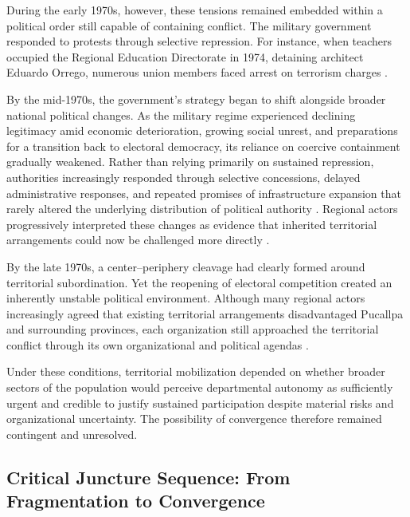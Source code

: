 \documentclass[12pt]{article}
\begin{document}
During the early 1970s, however, these tensions remained embedded within a political order still capable of containing conflict. The military government responded to protests through selective repression. For instance, when teachers occupied the Regional Education Directorate in 1974, detaining architect Eduardo Orrego, numerous union members faced arrest on terrorism charges \parencite{matos_tuesta_apuntes_2005,rengifo_pucallpazos_2020}.

By the mid-1970s, the government's strategy began to shift alongside broader national political changes. As the military regime experienced declining legitimacy amid economic deterioration, growing social unrest, and preparations for a transition back to electoral democracy, its reliance on coercive containment gradually weakened. Rather than relying primarily on sustained repression, authorities increasingly responded through selective concessions, delayed administrative responses, and repeated promises of infrastructure expansion that rarely altered the underlying distribution of political authority \parencite{vivanco_pimentel_gran_1997}. Regional actors progressively interpreted these changes as evidence that inherited territorial arrangements could now be challenged more directly \parencite{tapuya_huaman_documental_2024}.

By the late 1970s, a center--periphery cleavage had clearly formed around territorial subordination. Yet the reopening of electoral competition created an inherently unstable political environment. Although many regional actors increasingly agreed that existing territorial arrangements disadvantaged Pucallpa and surrounding provinces, each organization still approached the territorial conflict through its own organizational and political agendas \parencite{gobierno_regional_de_ucayali_importantes_2016,tapuya_huaman_documental_2024}.

Under these conditions, territorial mobilization depended on whether broader sectors of the population would perceive departmental autonomy as sufficiently urgent and credible to justify sustained participation despite material risks and organizational uncertainty. The possibility of convergence therefore remained contingent and unresolved.


\subsection{Critical Juncture Sequence: From Fragmentation to Convergence}
\end{document}
